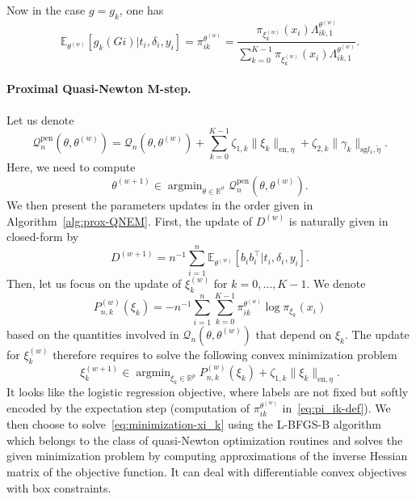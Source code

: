 \documentclass[11pt]{article}
\DeclareMathOperator{\argmin}{argmin}
\newcommand{\norm}[1]{\|#1\|}
\newcommand{\cQ}{\mathcal Q}
\newcommand{\R}{\mathds R}
\newcommand{\E}{\mathds E}
\begin{document}
Now in the case $g = g_k$, one has
\begin{equation}
\label{eq:pi_ik-def}
  \E_{\theta^{(w)}}[g_k(Gi) | t_i, \delta_i, y_i] = \pi_{ik}^{\theta^{(w)}} = \dfrac{\pi_{\xi_k^{(w)}}(x_i) \Lambda_{ik,1}^{\theta^{(w)}}}{\sum_{k=0}^{K-1} \pi_{\xi_k^{(w)}}(x_i) \Lambda_{ik,1}^{\theta^{(w)}}}.
\end{equation}

\paragraph*{Proximal Quasi-Newton M-step.}
Let us denote
\begin{equation}
  \label{eq:M-step-obj}
  \cQ_n^\text{pen}(\theta, \theta^{(w)}) = \cQ_n(\theta, \theta^{(w)}) + \sum_{k=0}^{K-1} \zeta_{1,k} \norm{\xi_k}_{\text{en}, \eta} + \zeta_{2,k} \norm{\gamma_k}_{\text{sg} l_1, \tilde{\eta}}.
\end{equation}
Here, we need to compute 
\[\theta^{(w+1)} \in \argmin_{\theta \in \R^\vartheta} \cQ_n^\text{pen}(\theta, \theta^{(w)}).\]
We then present the parameters updates in the order given in Algorithm~\ref{alg:prox-QNEM}.
First, the update of $D^{(w)}$ is naturally given in closed-form by
\begin{equation}
  \label{eq:update_D}
  D^{(w+1)} = n^{-1} \sum_{i=1}^n \E_{\theta^{(w)}}[ b_i b_i^\top | t_i, \delta_i, y_i].
\end{equation}
Then, let us focus on the update of $\xi_k^{(w)}$ for $k=0, \ldots, K-1$. We denote
\[ P^{(w)}_{n, k}(\xi_k) = -n^{-1} \sum_{i=1}^n \sum_{k=0}^{K-1} \pi_{ik}^{\theta^{(w)}} \log \pi_{\xi_k}(x_i) \]
based on the quantities involved in $\cQ_n(\theta, \theta^{(w)})$ that depend on $\xi_k$. The update for $\xi_k^{(w)}$ therefore requires to solve the following convex minimization problem
\begin{equation}
  \label{eq:minimization-xi_k}
  \xi_k^{(w+1)} \in \argmin_{\xi_k \in \R^p} P^{(w)}_{n,k}(\xi_k) + \zeta_{1,k} \norm{\xi_k}_{\text{en}, \eta}.
\end{equation}
It looks like the logistic regression objective, where labels are not fixed but softly encoded by the expectation step (computation of $\pi_{ik}^{\theta^{(w)}}$ in~\eqref{eq:pi_ik-def}). We then choose to solve~\eqref{eq:minimization-xi_k} using the L-BFGS-B algorithm~\citep{zhu1997algorithm} which belongs to the class of quasi-Newton optimization routines and solves the given minimization problem by computing approximations
of the inverse Hessian matrix of the objective function. It can deal with differentiable convex objectives with box constraints.
\end{document}
